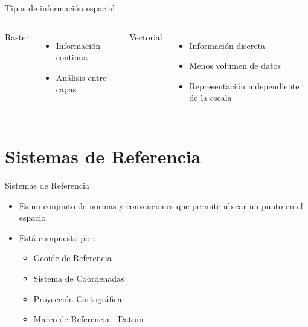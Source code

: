 \documentclass{beamer}
\begin{document}
\begin{frame}{Tipos de información espacial}
	\begin{columns}[t]
		Raster
		\begin{itemize}[<+->]
			\item Información continua
			\item Análisis entre capas
		\end{itemize}
		Vectorial
		\begin{itemize}[<+->]
			\item Información discreta
			\item Menos volumen de datos
			\item Representación independiente de la escala
		\end{itemize}
	\end{columns}
\end{frame}

\section{Sistemas de Referencia}

\begin{frame}{Sistemas de Referencia}
	\begin{itemize}[<+->]
		\item Es un conjunto de normas y convenciones que permite ubicar un punto en el espacio.
		\item Está compuesto por: 
		\begin{itemize}
			\item Geoide de Referencia
			\item Sistema de Coordenadas
			\item Proyección Cartográfica
			\item Marco de Referencia - Datum 
		\end{itemize}
	\end{itemize}
\end{frame}
\end{document}
